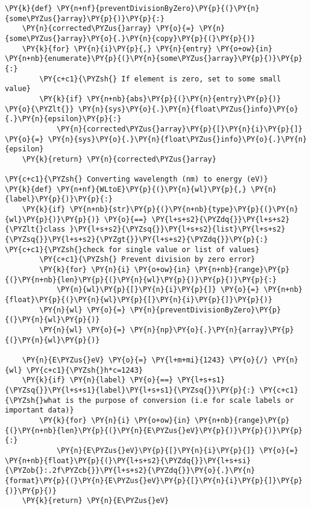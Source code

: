 \begin{tcolorbox}[breakable, size=fbox, boxrule=1pt, pad at break*=1mm,colback=cellbackground, colframe=cellborder]
\begin{Verbatim}[commandchars=\\\{\}]
\PY{k}{def} \PY{n+nf}{preventDivisionByZero}\PY{p}{(}\PY{n}{some\PYZus{}array}\PY{p}{)}\PY{p}{:}
    \PY{n}{corrected\PYZus{}array} \PY{o}{=} \PY{n}{some\PYZus{}array}\PY{o}{.}\PY{n}{copy}\PY{p}{(}\PY{p}{)}
    \PY{k}{for} \PY{n}{i}\PY{p}{,} \PY{n}{entry} \PY{o+ow}{in} \PY{n+nb}{enumerate}\PY{p}{(}\PY{n}{some\PYZus{}array}\PY{p}{)}\PY{p}{:}
        \PY{c+c1}{\PYZsh{} If element is zero, set to some small value}
        \PY{k}{if} \PY{n+nb}{abs}\PY{p}{(}\PY{n}{entry}\PY{p}{)} \PY{o}{\PYZlt{}} \PY{n}{sys}\PY{o}{.}\PY{n}{float\PYZus{}info}\PY{o}{.}\PY{n}{epsilon}\PY{p}{:}
            \PY{n}{corrected\PYZus{}array}\PY{p}{[}\PY{n}{i}\PY{p}{]} \PY{o}{=} \PY{n}{sys}\PY{o}{.}\PY{n}{float\PYZus{}info}\PY{o}{.}\PY{n}{epsilon}
    \PY{k}{return} \PY{n}{corrected\PYZus{}array}

\PY{c+c1}{\PYZsh{} Converting wavelength (nm) to energy (eV)}
\PY{k}{def} \PY{n+nf}{WLtoE}\PY{p}{(}\PY{n}{wl}\PY{p}{,} \PY{n}{label}\PY{p}{)}\PY{p}{:}
    \PY{k}{if} \PY{n+nb}{str}\PY{p}{(}\PY{n+nb}{type}\PY{p}{(}\PY{n}{wl}\PY{p}{)}\PY{p}{)} \PY{o}{==} \PY{l+s+s2}{\PYZdq{}}\PY{l+s+s2}{\PYZlt{}class }\PY{l+s+s2}{\PYZsq{}}\PY{l+s+s2}{list}\PY{l+s+s2}{\PYZsq{}}\PY{l+s+s2}{\PYZgt{}}\PY{l+s+s2}{\PYZdq{}}\PY{p}{:} \PY{c+c1}{\PYZsh{}check for single value or list of values}
        \PY{c+c1}{\PYZsh{} Prevent division by zero error}
        \PY{k}{for} \PY{n}{i} \PY{o+ow}{in} \PY{n+nb}{range}\PY{p}{(}\PY{n+nb}{len}\PY{p}{(}\PY{n}{wl}\PY{p}{)}\PY{p}{)}\PY{p}{:}
            \PY{n}{wl}\PY{p}{[}\PY{n}{i}\PY{p}{]} \PY{o}{=} \PY{n+nb}{float}\PY{p}{(}\PY{n}{wl}\PY{p}{[}\PY{n}{i}\PY{p}{]}\PY{p}{)}
        \PY{n}{wl} \PY{o}{=} \PY{n}{preventDivisionByZero}\PY{p}{(}\PY{n}{wl}\PY{p}{)}
        \PY{n}{wl} \PY{o}{=} \PY{n}{np}\PY{o}{.}\PY{n}{array}\PY{p}{(}\PY{n}{wl}\PY{p}{)}
        
    \PY{n}{E\PYZus{}eV} \PY{o}{=} \PY{l+m+mi}{1243} \PY{o}{/} \PY{n}{wl} \PY{c+c1}{\PYZsh{}h*c=1243}
    \PY{k}{if} \PY{n}{label} \PY{o}{==} \PY{l+s+s1}{\PYZsq{}}\PY{l+s+s1}{label}\PY{l+s+s1}{\PYZsq{}}\PY{p}{:} \PY{c+c1}{\PYZsh{}what is the purpose of conversion (i.e for scale labels or important data)}
        \PY{k}{for} \PY{n}{i} \PY{o+ow}{in} \PY{n+nb}{range}\PY{p}{(}\PY{n+nb}{len}\PY{p}{(}\PY{n}{E\PYZus{}eV}\PY{p}{)}\PY{p}{)}\PY{p}{:}
            \PY{n}{E\PYZus{}eV}\PY{p}{[}\PY{n}{i}\PY{p}{]} \PY{o}{=} \PY{n+nb}{float}\PY{p}{(}\PY{l+s+s2}{\PYZdq{}}\PY{l+s+si}{\PYZob{}:.2f\PYZcb{}}\PY{l+s+s2}{\PYZdq{}}\PY{o}{.}\PY{n}{format}\PY{p}{(}\PY{n}{E\PYZus{}eV}\PY{p}{[}\PY{n}{i}\PY{p}{]}\PY{p}{)}\PY{p}{)}
    \PY{k}{return} \PY{n}{E\PYZus{}eV}


\end{Verbatim}
\end{tcolorbox}

